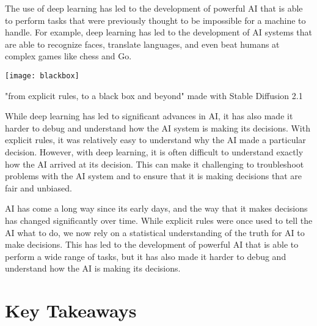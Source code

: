 The use of deep learning has led to the development of powerful AI that is able to perform tasks that were previously thought to be impossible for a machine to handle. For example, deep learning has led to the development of AI systems that are able to recognize faces, translate languages, and even beat humans at complex games like chess and Go.

\begin{marginfigure}[-5.5cm]
        \texttt{[image: blackbox]}
        \caption{"from explicit rules, to a black box and beyond" made with Stable Diffusion 2.1}
\end{marginfigure}

While deep learning has led to significant advances in AI, it has also made it harder to debug and understand how the AI system is making its decisions. With explicit rules, it was relatively easy to understand why the AI made a particular decision. However, with deep learning, it is often difficult to understand exactly how the AI arrived at its decision. This can make it challenging to troubleshoot problems with the AI system and to ensure that it is making decisions that are fair and unbiased.

AI has come a long way since its early days, and the way that it makes decisions has changed significantly over time. While explicit rules were once used to tell the AI what to do, we now rely on a statistical understanding of the truth for AI to make decisions. This has led to the development of powerful AI that is able to perform a wide range of tasks, but it has also made it harder to debug and understand how the AI is making its decisions.

\section{Key Takeaways}

